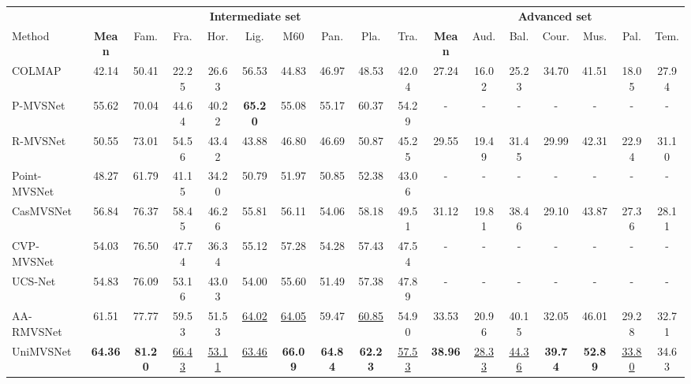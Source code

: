 \documentclass[10pt,twocolumn,letterpaper]{article}
\begin{document}
\begingroup
\setlength{\tabcolsep}{3pt} \begin{table*}[ht]
\footnotesize
  \begin{center}
    \begin{tabular}{lccccccccc|ccccccc}
    \toprule
    & \multicolumn{9}{c}{\textbf{Intermediate set}} & \multicolumn{7}{c}{\textbf{Advanced set}} \\
    \cmidrule{2-17}
    Method & \textbf{Mean } & Fam. & Fra. & Hor. & Lig. & M60 & Pan. & Pla. & Tra. & \textbf{Mean } & Aud. & Bal. & Cour. & Mus. & Pal. & Tem.\\
    \midrule
    COLMAP \cite{Johannes2016pixelwise} & 42.14 & 50.41 & 22.25 & 26.63 & 56.53 & 44.83 & 46.97 & 48.53 & 42.04 & 27.24 & 16.02 & 25.23 & 34.70 & 41.51 & 18.05 & 27.94\\
    P-MVSNet \cite{Luo2019Pmvsnet}& 55.62 & 70.04 & 44.64 & 40.22 & \textbf{65.20} & 55.08 & 55.17 & 60.37 & 54.29  & - & - & - & - & - & - & - \\
    R-MVSNet \cite{yao2019recurrent} & 50.55 & 73.01 & 54.56 & 43.42 & 43.88 & 46.80 & 46.69 & 50.87 & 45.25  & 29.55 & 19.49 & 31.45 & 29.99 & 42.31 & 22.94 & 31.10\\
    Point-MVSNet \cite{chen2019pointbased}& 48.27 & 61.79 & 41.15 & 34.20 & 50.79 & 51.97 & 50.85 & 52.38 & 43.06 & - & - & - & - & - & - & -\\
    CasMVSNet \cite{gu2019casmvsnet} & 56.84 & 76.37 & 58.45 & 46.26 & 55.81 & 56.11 & 54.06 & 58.18 &  49.51 & 31.12 & 19.81 & 38.46 & 29.10 & 43.87 & 27.36 & 28.11\\
    CVP-MVSNet \cite{yang2019CVPMVS}& 54.03 & 76.50 & 47.74 & 36.34 & 55.12 & 57.28 & 54.28 & 57.43 & 47.54  & - & - & - & - & - & - & - \\
    UCS-Net \cite{Cheng2019USCNet}& 54.83 & 76.09 & 53.16 & 43.03 & 54.00 & 55.60 & 51.49 & 57.38 & 47.89  & - & - & - & - & - & - & - \\
    AA-RMVSNet \cite{wei2021aa} & 61.51 & 77.77 & 59.53 & 51.53 & \underline{64.02} & \underline{64.05}& 59.47 & \underline{60.85} & 54.90  & 33.53 & 20.96 & 40.15 & 32.05 & 46.01 & 29.28 & 32.71\\
    UniMVSNet \cite{peng2022rethinkingMVS} & \textbf{64.36} & \textbf{81.20} & \underline{\underline{66.43}} & \underline{\underline{53.11}} & \underline{\underline{63.46}} & \textbf{66.09} & \textbf{64.84} & \textbf{62.23} & \underline{\underline{57.53}}  & \textbf{38.96} & \underline{28.33} & \underline{\underline{44.36}} & \textbf{39.74} & \textbf{52.89} & \underline{\underline{33.80}} & 34.63 \\

\end{tabular}
\end{center}
\end{table*}
\end{document}
